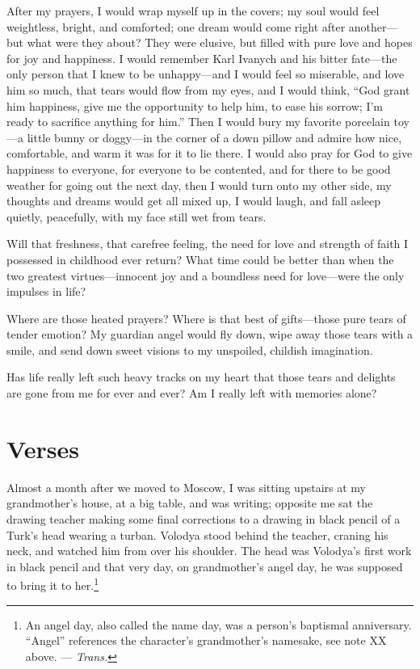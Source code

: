 After my prayers, I would wrap myself up in the covers; my soul would feel weightless, bright, and comforted; one dream would come right after another---but what were they about? They were elusive, but filled with pure love and hopes for joy and happiness. I would remember Karl Ivanych and his bitter fate---the only person that I knew to be unhappy---and I would feel so miserable, and love him so much, that tears would flow from my eyes, and I would think, ``God grant him happiness, give me the opportunity to help him, to ease his sorrow; I'm ready to sacrifice anything for him.'' Then I would bury my favorite porcelain toy---a little bunny or doggy---in the corner of a down pillow and admire how nice, comfortable, and warm it was for it to lie there. I would also pray for God to give happiness to everyone, for everyone to be contented, and for there to be good weather for going out the next day, then I would turn onto my other side, my thoughts and dreams would get all mixed up, I would laugh, and fall asleep quietly, peacefully, with my face still wet from tears.

Will that freshness, that carefree feeling, the need for love and strength of faith I possessed in childhood ever return? What time could be better than when the two greatest virtues---innocent joy and a boundless need for love---were the only impulses in life?

Where are those heated prayers? Where is that best of gifts---those pure tears of tender emotion? My guardian angel would fly down, wipe away those tears with a smile, and send down sweet visions to my unspoiled, childish imagination.

Has life really left such heavy tracks on my heart that those tears and delights are gone from me for ever and ever? Am I really left with memories alone?

\chapter{Verses} %

Almost a month after we moved to Moscow, I was sitting upstairs at my grandmother's house, at a big table, and was writing; opposite me sat the drawing teacher making some final corrections to a drawing in black pencil of a Turk's head wearing a turban. Volodya stood behind the teacher, craning his neck, and watched him from over his shoulder. The head was Volodya's first work in black pencil and that very day, on grandmother's angel day, he was supposed to bring it to her.\footnote{An angel day, also called the name day, was a person's baptismal anniversary. ``Angel'' references the character's grandmother's namesake, see note XX above. --- \textit{Trans.}} 

